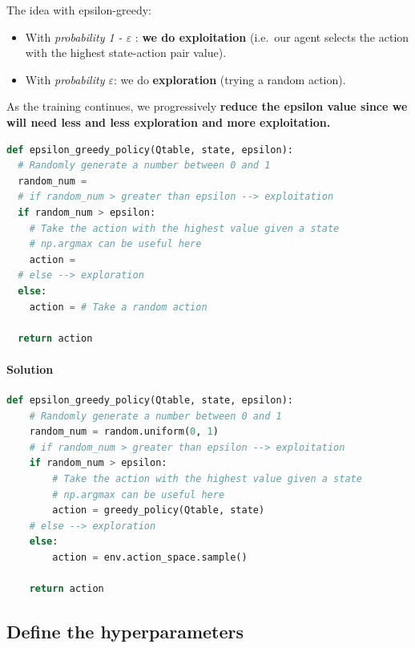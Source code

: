 \documentclass[11pt,a4paper]{article}
\begin{document}
The idea with epsilon-greedy:

\begin{itemize}
\item
  With \emph{probability 1 - \(\varepsilon\)} : \textbf{we do exploitation} (i.e.~our agent selects the action with the highest state-action pair value).
\item
  With \emph{probability \(\varepsilon\)}: we do \textbf{exploration} (trying a random action).
\end{itemize}

As the training continues, we progressively \textbf{reduce the epsilon value since we will need less and less exploration and more exploitation.}


\begin{lstlisting}[language=Python]
def epsilon_greedy_policy(Qtable, state, epsilon):
  # Randomly generate a number between 0 and 1
  random_num =
  # if random_num > greater than epsilon --> exploitation
  if random_num > epsilon:
    # Take the action with the highest value given a state
    # np.argmax can be useful here
    action =
  # else --> exploration
  else:
    action = # Take a random action

  return action
\end{lstlisting}

\paragraph{Solution}\label{solution-3}

\begin{lstlisting}[language=Python]
def epsilon_greedy_policy(Qtable, state, epsilon):
    # Randomly generate a number between 0 and 1
    random_num = random.uniform(0, 1)
    # if random_num > greater than epsilon --> exploitation
    if random_num > epsilon:
        # Take the action with the highest value given a state
        # np.argmax can be useful here
        action = greedy_policy(Qtable, state)
    # else --> exploration
    else:
        action = env.action_space.sample()

    return action
\end{lstlisting}

\subsection{Define the hyperparameters}\label{define-the-hyperparameters}
\end{document}
